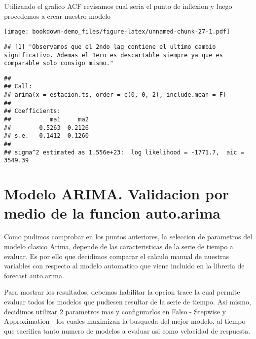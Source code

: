 \documentclass[
]{book}
\begin{document}
Utilizando el grafico ACF revisamos cual seria el punto de inflexion y luego procedemos a crear nuestro modelo

\texttt{[image: bookdown-demo\_files/figure-latex/unnamed-chunk-27-1.pdf]}

\begin{verbatim}
## [1] "Observamos que el 2ndo lag contiene el ultimo cambio significativo. Ademas el 1ero es descartable siempre ya que es comparable solo consigo mismo."
\end{verbatim}

\begin{verbatim}
## 
## Call:
## arima(x = estacion.ts, order = c(0, 0, 2), include.mean = F)
## 
## Coefficients:
##           ma1     ma2
##       -0.5263  0.2126
## s.e.   0.1412  0.1260
## 
## sigma^2 estimated as 1.556e+23:  log likelihood = -1771.7,  aic = 3549.39
\end{verbatim}

\hypertarget{modelo-arima.-validacion-por-medio-de-la-funcion-auto.arima}{%
\section{Modelo ARIMA. Validacion por medio de la funcion auto.arima}\label{modelo-arima.-validacion-por-medio-de-la-funcion-auto.arima}}

Como pudimos comprobar en los puntos anteriores, la seleccion de parametros del modelo clasico Arima, depende de las caracteristicas de la serie de tiempo a evaluar. Es por ello que decidimos comparar el calculo manual de nuestras variables con respecto al modelo automatico que viene incluido en la libreria de forecast auto.arima.

Para mostrar los resultados, debemos habilitar la opcion trace la cual permite evaluar todos los modelos que pudiesen resultar de la serie de tiempo. Asi mismo, decidimos utilizar 2 parametros mas y configurarlos en Falso - Stepwise y Approximation - los cuales maximizan la busqueda del mejor modelo, al tiempo que sacrifica tanto numero de modelos a evaluar asi como velocidad de respuesta.
\end{document}
